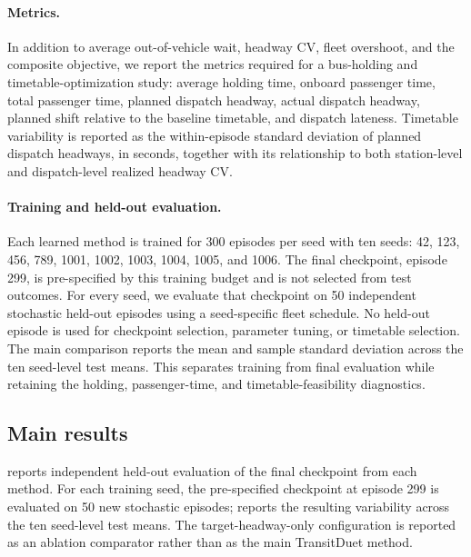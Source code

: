 \paragraph{Metrics.}
In addition to average out-of-vehicle wait, headway CV, fleet overshoot, and the composite objective, we report the metrics required for a bus-holding and timetable-optimization study: average holding time, onboard passenger time, total passenger time, planned dispatch headway, actual dispatch headway, planned shift relative to the baseline timetable, and dispatch lateness. Timetable variability is reported as the within-episode standard deviation of planned dispatch headways, in seconds, together with its relationship to both station-level and dispatch-level realized headway CV.

\paragraph{Training and held-out evaluation.}
Each learned method is trained for 300 episodes per seed with ten seeds: 42, 123, 456, 789, 1001, 1002, 1003, 1004, 1005, and 1006. The final checkpoint, episode 299, is pre-specified by this training budget and is not selected from test outcomes. For every seed, we evaluate that checkpoint on 50 independent stochastic held-out episodes using a seed-specific fleet schedule. No held-out episode is used for checkpoint selection, parameter tuning, or timetable selection.
The main comparison reports the mean and sample standard deviation across the ten seed-level test means. This separates training from final evaluation while retaining the holding, passenger-time, and timetable-feasibility diagnostics.

\subsection{Main results}
\label{sec:main_results}

 reports independent held-out evaluation of the final checkpoint from each method. For each training seed, the pre-specified checkpoint at episode 299 is evaluated on 50 new stochastic episodes;  reports the resulting variability across the ten seed-level test means. The target-headway-only configuration is reported as an ablation comparator rather than as the main TransitDuet method.

